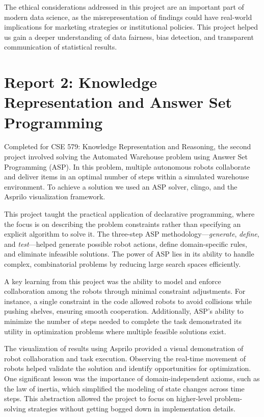 \documentclass{IEEEtran}
\begin{document}
The ethical considerations addressed in this project are an important part of modern data science, as the misrepresentation of findings could have real-world implications for marketing strategies or institutional policies. This project helped us gain a deeper understanding of data fairness, bias detection, and transparent communication of statistical results.

\section{Report 2: Knowledge Representation and Answer Set Programming}
Completed for CSE 579: Knowledge Representation and Reasoning, the second project involved solving the Automated Warehouse problem using Answer Set Programming (ASP). In this problem, multiple autonomous robots collaborate and deliver items in an optimal number of steps within a simulated warehouse environment. To achieve a solution we used an ASP solver, clingo, and the Asprilo visualization framework.

This project taught the practical application of declarative programming, where the focus is on describing the problem constraints rather than specifying an explicit algorithm to solve it. The three-step ASP methodology—\textit{generate}, \textit{define}, and \textit{test}—helped generate possible robot actions, define domain-specific rules, and eliminate infeasible solutions. The power of ASP lies in its ability to handle complex, combinatorial problems by reducing large search spaces efficiently.

A key learning from this project was the ability to model and enforce collaboration among the robots through minimal constraint adjustments. For instance, a single constraint in the code allowed robots to avoid collisions while pushing shelves, ensuring smooth cooperation. Additionally, ASP’s ability to minimize the number of steps needed to complete the task demonstrated its utility in optimization problems where multiple feasible solutions exist.

The visualization of results using Asprilo provided a visual demonstration of robot collaboration and task execution. Observing the real-time movement of robots helped validate the solution and identify opportunities for optimization. One significant lesson was the importance of domain-independent axioms, such as the law of inertia, which simplified the modeling of state changes across time steps. This abstraction allowed the project to focus on higher-level problem-solving strategies without getting bogged down in implementation details.
\end{document}
